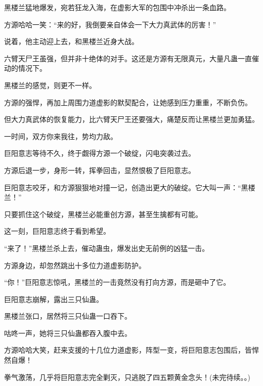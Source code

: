 \begin{this_body}
黑楼兰猛地爆发，宛若狂龙入海，在虚影大军的包围中冲杀出一条血路。

方源哈哈一笑：“来的好，我倒要亲自体会一下大力真武体的厉害！”

说着，他主动迎上去，和黑楼兰近身大战。

六臂天尸王虽强，但并非十绝体的对手。这还是方源有无限真元，大量凡蛊一直催动的情况下。

黑楼兰的感觉，则更不一样。

方源的强悍，再加上周围力道虚影的默契配合，让她感到压力重重，不断负伤。

但大力真武体的恢复能力，比六臂天尸王还要强大，痛楚反而让黑楼兰更加勇猛。

一时间，双方你来我往，势均力敌。

巨阳意志等待不久，终于觑得方源一个破绽，闪电突袭过去。

方源后退一步，身形一转，挥拳回击，显然恨极了巨阳意志。

巨阳意志咬牙，和方源狠狠地对撞一记，创造出更大的破绽。它大叫一声：“黑楼兰！”

只要抓住这个破绽，黑楼兰必能重创方源，甚至生擒都有可能。

这一刻，巨阳意志终于看到希望。

“来了！”黑楼兰杀上去，催动蛊虫，爆发出史无前例的凶猛一击。

方源身边，却忽然跳出十多位力道虚影防护。

“你！”巨阳意志惊吼，黑楼兰的一击竟然没有打向方源，而是砸中了它。

巨阳意志崩解，露出三只仙蛊。

黑楼兰张口，居然将三只仙蛊一口吞下。

咕咚一声，她将三只仙蛊都吞入腹中去。

方源哈哈大笑，赶来支援的十几位力道虚影，阵型一变，将巨阳意志包围后，皆悍然自爆！

拳气激荡，几乎将巨阳意志完全剿灭，只逃脱了四五颗黄金念头！(未完待续。。)

\end{this_body}


